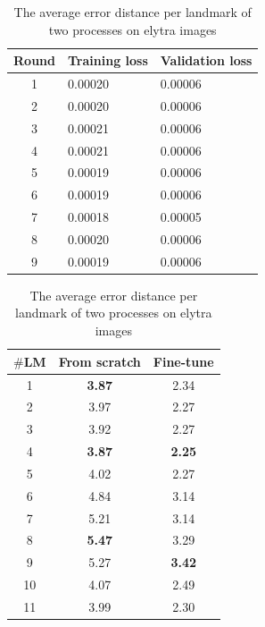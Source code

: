 \documentclass[review]{elsarticle}
\begin{document}
\begin{table}[htbp]
	\begin{minipage}[t]{0.45\textwidth}
	\centering
	\begin{tabular}{c p{1.5cm} p{1.5cm}}
	Round & Training loss & Validation loss \\ \hline
	1 & 0.00020 & 0.00006  \\ \hline
	2 & 0.00020 & 0.00006 \\ \hline
	3 & 0.00021 & 0.00006 \\ \hline
	4 & 0.00021 & 0.00006 \\ \hline
	5 & 0.00019 & 0.00006 \\ \hline
	6 & 0.00019 & 0.00006 \\ \hline
	7 & 0.00018 & 0.00005 \\ \hline
	8 & 0.00020 & 0.00006 \\ \hline
	9 & 0.00019 & 0.00006 \\ \hline
	\end{tabular}
	\caption{The losses during fine-tuning model on elytra dataset}
	\label{tblftbody}
\end{minipage}
\hfill
\begin{minipage}[t]{0.45\textwidth}
\centering
\begin{tabular}{|c|c|c|}
\hline
\textbf{$\#$LM} & \textbf{From scratch} & \textbf{Fine-tune} \\ \hline
1 & \textbf{3.87} & 2.34  \\ \hline
2 & 3.97 & 2.27  \\ \hline
3 & 3.92  & 2.27 \\ \hline
4 & \textbf{3.87}  & \textbf{2.25} \\ \hline
5 & 4.02  & 2.27 \\ \hline
6 & 4.84  & 3.14 \\ \hline
7 & 5.21  & 3.14 \\ \hline
8 & \textbf{5.47}  & 3.29 \\ \hline
9 & 5.27  & \textbf{3.42} \\ \hline
10 & 4.07  & 2.49 \\ \hline
11 & 3.99  & 2.30 \\ \hline
\end{tabular}
\caption{The average error distance per landmark of two processes on elytra images}
\label{tblcmpbody}
\end{minipage}
\end{table}
\end{document}
